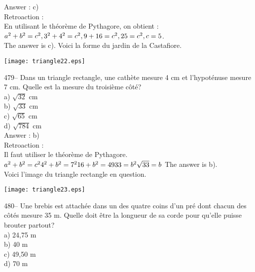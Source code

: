 ﻿\documentclass[letterpaper, 12pt]{article}
\begin{document}
Answer :  c)\\

Retroaction : \\
En utilisant le th\'eor\`eme de Pythagore, on obtient :\\
$a^{2}+b^{2}=c^{2},\\
3^{2}+4^{2}=c^{2},\\
9+16=c^{2},\\
25=c^{2},\\
c=5$.\\
The answer is c).  Voici la forme du jardin de la Castafiore.\\
    \begin{center}
    \texttt{[image: triangle22.eps]}
    \end{center}


479-- Dans un triangle rectangle, une cath\`ete mesure 4 cm et
l'hypot\'enuse mesure 7 cm.  Quelle est la mesure du troisi\`eme c\^ot\'e?\\
a) $\sqrt{32}$ cm\\
b) $\sqrt{33}$ cm\\
c) $\sqrt{65}$ cm\\
d) $\sqrt{784}$ cm\\

Answer :  b)\\

Retroaction : \\
Il faut utiliser le th\'eor\`eme de Pythagore.  \\
$a^{2}+b^{2}=c^{2}\\
4^{2}+b^{2}=7^{2}\\
16+b^{2}=49\\
33=b^{2}\\
\sqrt{33}=b\\$
The answer is b).\\
Voici l'image du triangle rectangle en question.\\
    \begin{center}
    \texttt{[image: triangle23.eps]}
    \end{center}


480--  Une brebis est attach\'ee dans un des quatre coins d'un pr\'e dont
chacun des c\^ot\'es mesure 35 m.  Quelle doit \^etre la longueur de sa
corde pour qu'elle puisse brouter partout?\\
a) 24,75 m\\
b) 40 m\\
c) 49,50 m\\
d) 70 m\\
\end{document}
